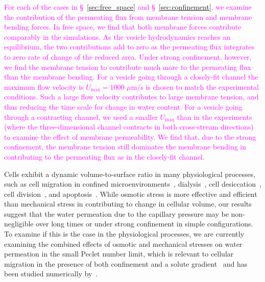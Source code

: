 \documentclass[prb,preprint,showpacs,preprintnumbers,amsmath,amssymb,longbibliography]{revtex4-1}
\begin{document}
\textcolor{magenta}{
For each of the cases in \S~\ref{sec:free_space} and
\S~\ref{sec:confinement}, we examine the contribution of the permeating
flux from membrane tension and membrane bending forces. In free space,
we find that both membrane forces contribute comparably in the
simulations. As the vesicle hydrodynamics reaches an equilibrium, the
two contributions add to zero as the permeating flux integrates to zero
rate of change of the reduced area.  Under strong confinement, however,
we find the membrane tension to contribute much more to the permeating
flux than the membrane bending. For a vesicle going through a
closely-fit channel the maximum flow velocity is $U_{\max}=1000$
$\mu$m/s is chosen to match the experimental conditions. Such a large
flow velocity contributes to large membrane tension, and thus reducing
the time scale for change in water content. For a vesicle going through
a contracting channel, we used a smaller $U_{\max}$ than in the
experiments (where the three-dimensional channel contracts in both
cross-stream directions) to examine the effect of membrane permeability.
We find that, due to the strong confinement, the membrane tension still
dominates the membrane bending in contributing to the permeating flux as
in the closely-fit channel.
}


Cells exhibit a dynamic volume-to-surface ratio in 
many physiological processes, such as 
cell migration in confined microenvironments~\cite{StrokaJiangChenEtAl2014_Cell, papadopoulos2008aquaporins}, 
dialysis~\cite{wan2006}, cell desiccation~\cite{vogl2014effect}, cell
division~\cite{OdermattMiettinenKangEtAl2020_bioRxiv}, and
apoptosis~\cite{marchetti1996mitochondrial}. While osmotic stress  is
more effective and efficient than mechanical stress in contributing to
change in cellular volume, our results suggest that the water permeation
due to the capillary pressure may be non-negligible over long times or
under strong confinement in simple configurations.  To examine if this
is the case in the physiological processes, we are currently examining
the combined effects of osmotic and mechanical stresses on water
permeation in the small Peclet number limit, which is relevant to
cellular migration in the presence of both confinement and a solute
gradient~\cite{StrokaJiangChenEtAl2014_Cell} and has been studied
numerically by~\citet{jae-car-med-try1999}.
\end{document}

